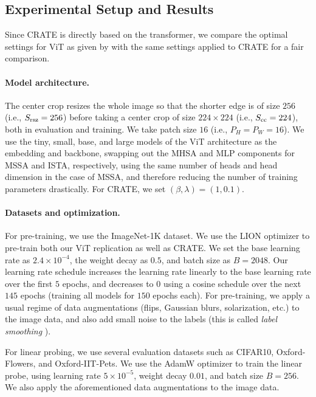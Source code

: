 \documentclass[../../book-main.tex]{subfiles}
\begin{document}
\subsection{Experimental Setup and Results}\label{sub:image_classification_experiments}

Since CRATE is directly based on the transformer, we compare the optimal settings for ViT as given by \cite{dosovitskiy2020image,touvron2020training} with the same settings applied to CRATE for a fair comparison.

\paragraph{Model architecture.} The center crop resizes the whole image so that the shorter edge is of size \(256\) (i.e., \(S_{\mathrm{rsz}} = 256\)) before taking a center crop of size \(224 \times 224\) (i.e., \(S_{\mathrm{cc}} = 224\)), both in evaluation and training. We take patch size \(16\) (i.e., \(P_{H} = P_{W} = 16\)). We use the tiny, small, base, and large models of the ViT \cite{dosovitskiy2020image} architecture as the embedding and backbone, swapping out the MHSA and MLP components for MSSA and ISTA, respectively, using the same number of heads and head dimension in the case of MSSA, and therefore reducing the number of training parameters drastically. For CRATE, we set \((\beta, \lambda) = (1, 0.1)\).

\paragraph{Datasets and optimization.} For pre-training, we use the ImageNet-1K dataset. We use the LION optimizer \citep{chen2024symbolic} to pre-train both our ViT replication as well as CRATE. We set the base learning rate as \(2.4 \times 10^{-4}\), the weight decay as \(0.5\), and batch size as \(B = 2048\). Our learning rate schedule increases the learning rate linearly to the base learning rate over the first \(5\) epochs, and decreases to \(0\) using a cosine schedule over the next \(145\) epochs (training all models for \(150\) epochs each). For pre-training, we apply a usual regime of data augmentations (flips, Gaussian blurs, solarization, etc.) to the image data, and also add small noise to the labels (this is called \textit{label smoothing} \citep{muller2019does}).

For linear probing, we use several evaluation datasets such as CIFAR10, Oxford-Flowers, and Oxford-IIT-Pets. We use the AdamW optimizer to train the linear probe, using learning rate \(5 \times 10^{-5}\), weight decay \(0.01\), and batch size \(B = 256\). We also apply the aforementioned data augmentations to the image data.
\end{document}
